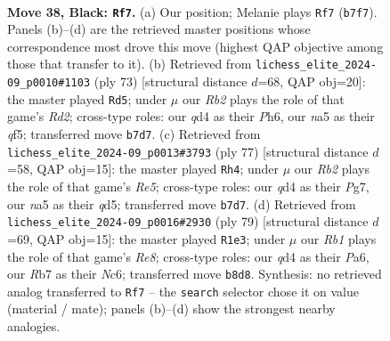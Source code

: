 \documentclass[11pt]{article}
\begin{document}
\clearpage

\begin{figure}[p]\centering
\begin{subfigure}{0.46\textwidth}\centering
\resizebox{\linewidth}{!}{%
\newchessgame
\chessboard[
  setfen={1r4k1/1r5p/8/Np6/3Q3P/8/PP3PP1/3R1K2 b - - 0 38},
  showmover=false,
  pgfstyle=straightmove, color=movearrow, markmove={b7-f7}
]}
\caption{}
\end{subfigure}\hfill
\begin{subfigure}{0.46\textwidth}\centering
\resizebox{\linewidth}{!}{%
\newchessgame
\chessboard[
  setfen={3r4/1k1r2p1/1p5p/5Q2/PP6/6P1/5P1P/6K1 b - - 0 37},
  showmover=false,
  pgfstyle=straightmove, color=movearrow, markmove={d7-d5}
]}
\caption{}
\end{subfigure}
\\[4pt]
\begin{subfigure}{0.46\textwidth}\centering
\resizebox{\linewidth}{!}{%
\newchessgame
\chessboard[
  setfen={4r2k/p5p1/8/3Q2Pn/4r3/1P6/P6P/5R1K b - - 4 39},
  showmover=false,
  pgfstyle=straightmove, color=movearrow, markmove={e4-h4}
]}
\caption{}
\end{subfigure}\hfill
\begin{subfigure}{0.46\textwidth}\centering
\resizebox{\linewidth}{!}{%
\newchessgame
\chessboard[
  setfen={8/1p2r1k1/p1nQ4/8/5P2/P1P4P/6PK/4r3 b - - 0 40},
  showmover=false,
  pgfstyle=straightmove, color=movearrow, markmove={e1-e3}
]}
\caption{}
\end{subfigure}
\caption{\textbf{Move 38, Black: \texttt{Rf7}.} (a) Our position; Melanie plays \texttt{Rf7} (\texttt{b7f7}). Panels (b)--(d) are the retrieved master positions whose correspondence most drove this move (highest QAP objective among those that transfer to it). (b) Retrieved from \texttt{lichess\_elite\_2024-09\_p0010\#1103} (ply 73) [structural distance $d$=68, QAP obj=20]: the master played \texttt{Rd5}; under $\mu$ our \emph{Rb2} plays the role of that game's \emph{Rd2}; cross-type roles: our \emph{q}d4 as their \emph{P}h6, our \emph{n}a5 as their \emph{q}f5; transferred move \texttt{b7d7}. (c) Retrieved from \texttt{lichess\_elite\_2024-09\_p0013\#3793} (ply 77) [structural distance $d$=58, QAP obj=15]: the master played \texttt{Rh4}; under $\mu$ our \emph{Rb2} plays the role of that game's \emph{Re5}; cross-type roles: our \emph{q}d4 as their \emph{P}g7, our \emph{n}a5 as their \emph{q}d5; transferred move \texttt{b7d7}. (d) Retrieved from \texttt{lichess\_elite\_2024-09\_p0016\#2930} (ply 79) [structural distance $d$=69, QAP obj=15]: the master played \texttt{R1e3}; under $\mu$ our \emph{Rb1} plays the role of that game's \emph{Re8}; cross-type roles: our \emph{q}d4 as their \emph{P}a6, our \emph{R}b7 as their \emph{N}c6; transferred move \texttt{b8d8}. Synthesis: no retrieved analog transferred to \texttt{Rf7} -- the \texttt{search} selector chose it on value (material / mate); panels (b)--(d) show the strongest nearby analogies.}
\label{fig:thought-m75}
\end{figure}
\end{document}
